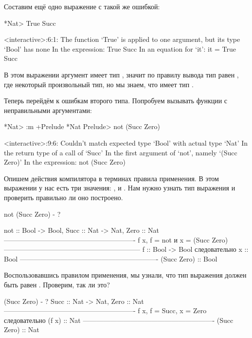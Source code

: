 Составим ещё одно выражение с такой же ошибкой:

\begin{code}
*Nat> True Succ

<interactive>:6:1:
    The function `True' is applied to one argument,
    but its type `Bool' has none
    In the expression: True Succ
    In an equation for `it': it = True Succ
\end{code}

В этом выражении аргумент  имеет тип ,
значит по правилу вывода тип  равен ,
где  некоторый произвольный тип, но мы знаем, что
 имеет тип . 

Теперь перейдём к ошибкам второго типа. Попробуем вызывать
функции с неправильными аргументами:

\begin{code}
*Nat> :m +Prelude
*Nat Prelude> not (Succ Zero)

<interactive>:9:6:
    Couldn't match expected type `Bool' with actual type `Nat'
    In the return type of a call of `Succ'
    In the first argument of `not', namely `(Succ Zero)'
    In the expression: not (Succ Zero)
\end{code}

Опишем действия компилятора в терминах правила применения.
В этом выражении у нас есть три значения: ,  и
. Нам нужно узнать тип выражения и проверить правильно
ли оно построено.  

\begin{code}
not (Succ Zero) - ? 

     not :: Bool -> Bool,    Succ :: Nat -> Nat,    Zero :: Nat
     ----------------------------------------------------------
            f x, f = not и x = (Succ Zero)
    ------------------------------------------------------------
            f :: Bool -> Bool следовательно x :: Bool
    -------------------------------------------------------------
            (Succ Zero) :: Bool
\end{code}

Воспользовавшись правилом применения, мы узнали, что тип
выражения  должен быть равен .
Проверим, так ли это?

\begin{code}
(Succ Zero) - ?
        Succ :: Nat -> Nat,     Zero :: Nat
     ----------------------------------------------------------
            f x, f = Succ, x = Zero следовательно (f x) :: Nat
     ----------------------------------------------------------
                        (Succ Zero) :: Nat
\end{code}

